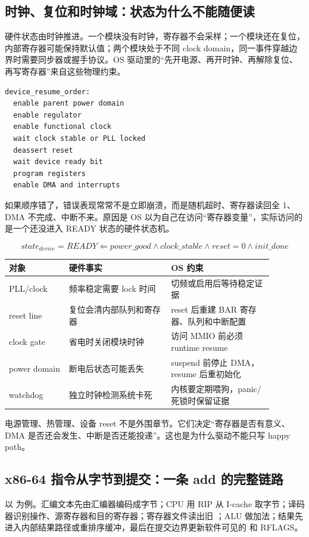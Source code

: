 \subsection{时钟、复位和时钟域：状态为什么不能随便读}

硬件状态由时钟推进。一个模块没有时钟，寄存器不会采样；一个模块还在复位，内部寄存器可能保持默认值；两个模块处于不同 clock domain，同一事件穿越边界时需要同步器或握手协议。OS 驱动里的“先开电源、再开时钟、再解除复位、再写寄存器”来自这些物理约束。

\begin{lstlisting}
device_resume_order:
  enable parent power domain
  enable regulator
  enable functional clock
  wait clock stable or PLL locked
  deassert reset
  wait device ready bit
  program registers
  enable DMA and interrupts
\end{lstlisting}

如果顺序错了，错误表现常常不是立即崩溃，而是随机超时、寄存器读回全 1、DMA 不完成、中断不来。原因是 OS 以为自己在访问“寄存器变量”，实际访问的是一个还没进入 READY 状态的硬件状态机。

\[
state_{device}=READY
\Leftarrow
power\_good \land clock\_stable \land reset=0 \land init\_done
\]

\begin{longtable}{p{0.20\linewidth}p{0.34\linewidth}p{0.34\linewidth}}
\toprule
对象 & 硬件事实 & OS 约束 \\
\midrule
PLL/clock & 频率稳定需要 lock 时间 & 切频或启用后等待稳定证据 \\
reset line & 复位会清内部队列和寄存器 & reset 后重建 BAR 寄存器、队列和中断配置 \\
clock gate & 省电时关闭模块时钟 & 访问 MMIO 前必须 runtime resume \\
power domain & 断电后状态可能丢失 & suspend 前停止 DMA，resume 后重初始化 \\
watchdog & 独立时钟检测系统卡死 & 内核要定期喂狗，panic/死锁时保留证据 \\
\bottomrule
\end{longtable}

电源管理、热管理、设备 reset 不是外围章节。它们决定“寄存器是否有意义、DMA 是否还会发生、中断是否还能投递”。这也是为什么驱动不能只写 happy path。

\subsection{x86-64 指令从字节到提交：一条 add 的完整链路}

以  为例。汇编文本先由汇编器编码成字节；CPU 用 RIP 从 I-cache 取字节；译码器识别操作、源寄存器和目的寄存器；寄存器文件读出旧 ；ALU 做加法；结果先进入内部结果路径或重排序缓冲，最后在提交边界更新软件可见的  和 RFLAGS。

